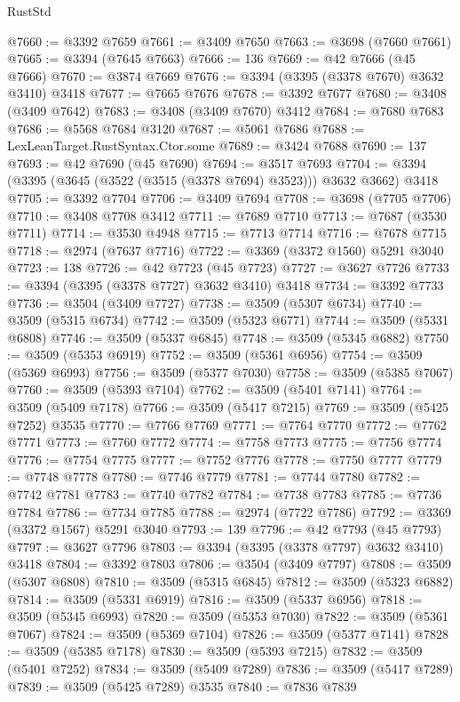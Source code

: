 \begin{lexlean}{RustStd}
\begin{coremodule}
@7660 := @3392 @7659
@7661 := @3409 @7650
@7663 := @3698 (@7660 @7661)
@7665 := @3394 (@7645 @7663)
@7666 := 136
@7669 := @42 @7666 (@45 @7666)
@7670 := @3874 @7669
@7676 := @3394 (@3395 (@3378 @7670) @3632 @3410) @3418
@7677 := @7665 @7676
@7678 := @3392 @7677
@7680 := @3408 (@3409 @7642)
@7683 := @3408 (@3409 @7670) @3412
@7684 := @7680 @7683
@7686 := @5568 @7684 @3120
@7687 := @5061 @7686
@7688 := LexLeanTarget.RustSyntax.Ctor.some
@7689 := @3424 @7688
@7690 := 137
@7693 := @42 @7690 (@45 @7690)
@7694 := @3517 @7693
@7704 := @3394 (@3395 (@3645 (@3522 (@3515 (@3378 @7694) @3523))) @3632 @3662) @3418
@7705 := @3392 @7704
@7706 := @3409 @7694
@7708 := @3698 (@7705 @7706)
@7710 := @3408 @7708 @3412
@7711 := @7689 @7710
@7713 := @7687 (@3530 @7711)
@7714 := @3530 @4948
@7715 := @7713 @7714
@7716 := @7678 @7715
@7718 := @2974 (@7637 @7716)
@7722 := @3369 (@3372 @1560) @5291 @3040
@7723 := 138
@7726 := @42 @7723 (@45 @7723)
@7727 := @3627 @7726
@7733 := @3394 (@3395 (@3378 @7727) @3632 @3410) @3418
@7734 := @3392 @7733
@7736 := @3504 (@3409 @7727)
@7738 := @3509 (@5307 @6734)
@7740 := @3509 (@5315 @6734)
@7742 := @3509 (@5323 @6771)
@7744 := @3509 (@5331 @6808)
@7746 := @3509 (@5337 @6845)
@7748 := @3509 (@5345 @6882)
@7750 := @3509 (@5353 @6919)
@7752 := @3509 (@5361 @6956)
@7754 := @3509 (@5369 @6993)
@7756 := @3509 (@5377 @7030)
@7758 := @3509 (@5385 @7067)
@7760 := @3509 (@5393 @7104)
@7762 := @3509 (@5401 @7141)
@7764 := @3509 (@5409 @7178)
@7766 := @3509 (@5417 @7215)
@7769 := @3509 (@5425 @7252) @3535
@7770 := @7766 @7769
@7771 := @7764 @7770
@7772 := @7762 @7771
@7773 := @7760 @7772
@7774 := @7758 @7773
@7775 := @7756 @7774
@7776 := @7754 @7775
@7777 := @7752 @7776
@7778 := @7750 @7777
@7779 := @7748 @7778
@7780 := @7746 @7779
@7781 := @7744 @7780
@7782 := @7742 @7781
@7783 := @7740 @7782
@7784 := @7738 @7783
@7785 := @7736 @7784
@7786 := @7734 @7785
@7788 := @2974 (@7722 @7786)
@7792 := @3369 (@3372 @1567) @5291 @3040
@7793 := 139
@7796 := @42 @7793 (@45 @7793)
@7797 := @3627 @7796
@7803 := @3394 (@3395 (@3378 @7797) @3632 @3410) @3418
@7804 := @3392 @7803
@7806 := @3504 (@3409 @7797)
@7808 := @3509 (@5307 @6808)
@7810 := @3509 (@5315 @6845)
@7812 := @3509 (@5323 @6882)
@7814 := @3509 (@5331 @6919)
@7816 := @3509 (@5337 @6956)
@7818 := @3509 (@5345 @6993)
@7820 := @3509 (@5353 @7030)
@7822 := @3509 (@5361 @7067)
@7824 := @3509 (@5369 @7104)
@7826 := @3509 (@5377 @7141)
@7828 := @3509 (@5385 @7178)
@7830 := @3509 (@5393 @7215)
@7832 := @3509 (@5401 @7252)
@7834 := @3509 (@5409 @7289)
@7836 := @3509 (@5417 @7289)
@7839 := @3509 (@5425 @7289) @3535
@7840 := @7836 @7839

\end{coremodule}
\end{lexlean}
